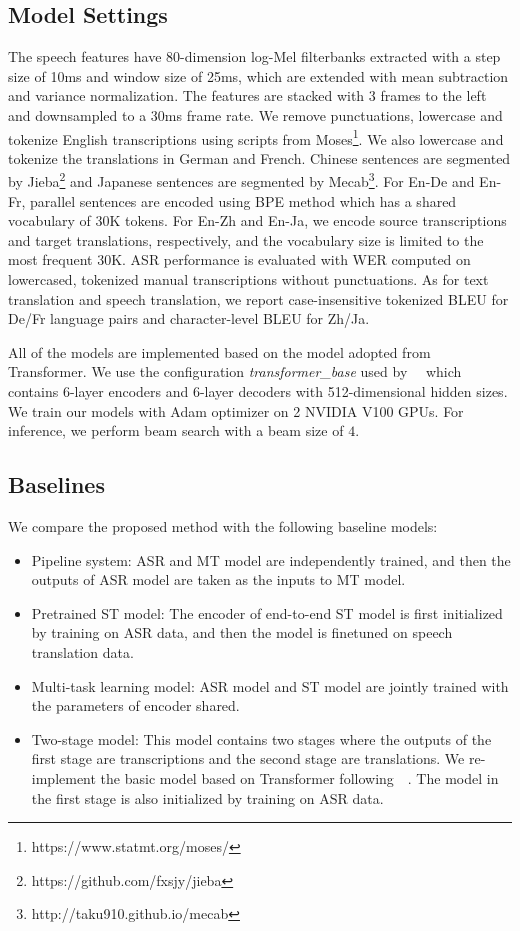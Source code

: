 \documentclass[letterpaper]{article} %
\begin{document}
\subsection{Model Settings}
The speech features have 80-dimension log-Mel filterbanks extracted with a step size of 10ms and window size of 25ms, which are extended with mean subtraction and variance normalization. The features are stacked with 3 frames to the left and downsampled to a 30ms frame rate.
We remove punctuations, lowercase and tokenize  English transcriptions using scripts from Moses\footnote{https://www.statmt.org/moses/}.
We also lowercase and tokenize the translations in German and French.
Chinese sentences are segmented by Jieba\footnote{https://github.com/fxsjy/jieba} and Japanese sentences are segmented by Mecab\footnote{http://taku910.github.io/mecab}.
For En-De and En-Fr, parallel sentences are encoded using BPE method \cite{sennrich2015neural} which has a shared vocabulary of 30K tokens. For En-Zh and En-Ja, we encode source transcriptions and target translations, respectively, and the vocabulary size is limited to the most frequent 30K.
ASR performance is evaluated with WER computed on lowercased, tokenized manual transcriptions without punctuations. As for text translation and speech translation, we report case-insensitive tokenized BLEU \cite{papineni2002bleu} for De/Fr language pairs and character-level BLEU for Zh/Ja.

All of the models are implemented based on the model adopted from Transformer. We use the configuration \textit{transformer\_base} used by~\citeauthor{vaswani2017attention}~ which contains 6-layer encoders and 6-layer decoders with 512-dimensional hidden sizes.
We train our models with Adam optimizer \cite{kingma2014adam} on 2 NVIDIA V100 GPUs. For inference, we perform beam search with a beam size of $4$.

\subsection{Baselines}
We compare the proposed method with the following baseline models:
\begin{itemize}
	\item Pipeline system: ASR and MT model are independently trained, and then the outputs of ASR model are taken as the inputs to MT model.
	\item Pretrained ST model: The encoder of end-to-end ST model is first initialized by training on ASR data, and then the model is finetuned on speech translation data.
	\item Multi-task learning model: ASR model and ST model are jointly trained with the parameters of encoder shared.
	\item Two-stage model: This model contains two stages where the outputs of the first stage are transcriptions and the second stage are translations. We re-implement the basic model based on Transformer following~\citeauthor{sperber2019attention}~. The model in the first stage is also initialized by training on ASR data.
\end{itemize}
\end{document}
